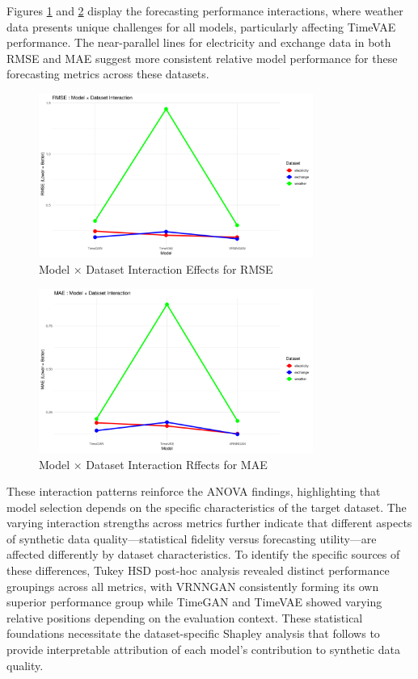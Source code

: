 \documentclass{article}
\begin{document}
Figures \ref{fig:rmse_interaction} and \ref{fig:mae_interaction} display the forecasting performance interactions, where weather data presents unique challenges for all models, particularly affecting TimeVAE performance. The near-parallel lines for electricity and exchange data in both RMSE and MAE suggest more consistent relative model performance for these forecasting metrics across these datasets.

\begin{figure}[H]
\centering
\includegraphics[width=0.8\textwidth]{assets/interaction_rmse.png}
\caption{Model × Dataset Interaction Effects for RMSE}
\label{fig:rmse_interaction}
\end{figure}

\begin{figure}[H]
\centering
\includegraphics[width=0.8\textwidth]{assets/interaction_mae.png}
\caption{Model × Dataset Interaction Rffects for MAE}
\label{fig:mae_interaction}
\end{figure}

These interaction patterns reinforce the ANOVA findings, highlighting that model selection depends on the specific characteristics of the target dataset. The varying interaction strengths across metrics further indicate that different aspects of synthetic data quality—statistical fidelity versus forecasting utility—are affected differently by dataset characteristics. To identify the specific sources of these differences, Tukey HSD post-hoc analysis revealed distinct performance groupings across all metrics, with VRNNGAN consistently forming its own superior performance group while TimeGAN and TimeVAE showed varying relative positions depending on the evaluation context. These statistical foundations necessitate the dataset-specific Shapley analysis that follows to provide interpretable attribution of each model's contribution to synthetic data quality.
\end{document}

